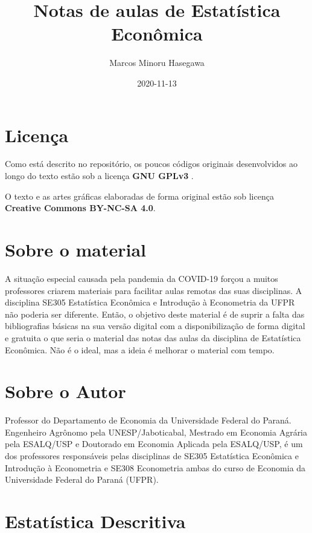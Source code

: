 \documentclass[
]{book}
\title{Notas de aulas de Estatística Econômica}
\author{Marcos Minoru Hasegawa}
\date{2020-11-13}
\begin{document}
\maketitle

{
\setcounter{tocdepth}{1}
\tableofcontents
}
\hypertarget{licenuxe7a}{%
\chapter*{Licença}\label{licenuxe7a}}

Como está descrito no repositório, os poucos códigos originais desenvolvidos ao longo do texto estão sob a licença \textbf{GNU GPLv3} .

O texto e as artes gráficas elaboradas de forma original estão sob licença \textbf{Creative Commons BY-NC-SA 4.0}.

\hypertarget{sobre-o-material}{%
\chapter*{Sobre o material}\label{sobre-o-material}}

A situação especial causada pela pandemia da COVID-19 forçou a muitos professores criarem materiais para facilitar aulas remotas das suas disciplinas. A disciplina SE305 Estatística Econômica e Introdução à Econometria da UFPR não poderia ser diferente. Então, o objetivo deste material é de suprir a falta das bibliografias básicas na sua versão digital com a disponibilização de forma digital e gratuita o que seria o material das notas das aulas da disciplina de Estatística Econômica. Não é o ideal, mas a ideia é melhorar o material com tempo.

\hypertarget{sobre-o-autor}{%
\chapter*{Sobre o Autor}\label{sobre-o-autor}}

Professor do Departamento de Economia da Universidade Federal do Paraná. Engenheiro Agrônomo pela UNESP/Jaboticabal, Mestrado em Economia Agrária pela ESALQ/USP e Doutorado em Economia Aplicada pela ESALQ/USP, é um dos professores responsáveis pelas disciplinas de SE305 Estatística Econômica e Introdução à Econometria e SE308 Econometria ambas do curso de Economia da Universidade Federal do Paraná (UFPR).

\hypertarget{estatuxedstica-descritiva}{%
\chapter{Estatística Descritiva}\label{estatuxedstica-descritiva}}
\end{document}
